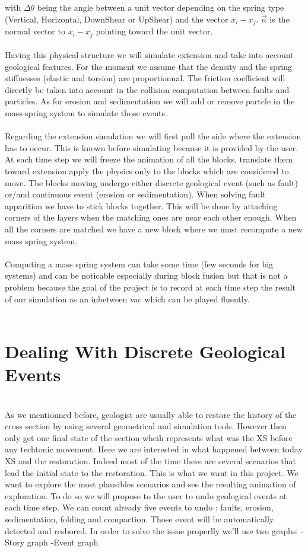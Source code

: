 \documentclass[12pt, a4paper]{memoir} %
\begin{document}
with $\Delta \theta$ being the angle between a unit vector depending on the spring type (Vertical, Horizontal, DownShear or UpShear) and the vector $x_i - x_j$. $\vec{n}$ is the normal vector to $x_i - x_j$ pointing toward the unit vector.\\\\
Having this physical structure we will simulate extension and take into account geological features. For the moment we assume that the density and the spring stiffnesses (elastic and torsion) are proportionnal. The friction coefficient will directly be taken into account in the collision computation between faults and particles. As for erosion and sedimentation we will add or remove partcle in the mass-spring system to simulate those events.\\\\
Regarding the extension simulation we will first pull the side where the extension has to occur. This is known before simulating because it is provided by the user. At each time step we will freeze the animation of all the blocks, translate them toward extension apply the physics only to the blocks which are considered to move. The blocks moving undergo either discrete geological event (such as fault) or/and continuous event (erosion or sedimentation). When solving fault apparition we have to stick blocks together. This will be done by attaching corners of the layers when the matching ones are near each other enough. When all the corners are matched we have a new block where we must recompute a new mass spring system.\\\\
Computing a mass spring system can take some time (few seconds for big systems) and can be noticable especially during block fusion but that is not a problem because the goal of the project is to record at each time step the result of our simulation as an inbetween vac which can be played fluently.\\\\

\section{Dealing With Discrete Geological Events}\\

As we mentionned before, geologist are usually able to restore the history of the cross section by using several geometrical and simulation tools.
However then only get one final state of the section whcih represents what was the XS before any techtonic movement. Here we are interested in what 
happened between today XS and the restoration. Indeed most of the time there are several scenarios that lead the initial state to the restoration.
This is what we want in this project. We want to explore the most plausibles scenarios and see the resulting animation of exploration.
To do so we will propose to the user to undo geological events at each time step. We can count already five events to undo : faults, erosion, sedimentation, folding and compaction. Those event will be automatically detected and resbored. In order to solve the issue properlly we'll use two graphs:
	-Story graph
	-Event graph
\end{document}
